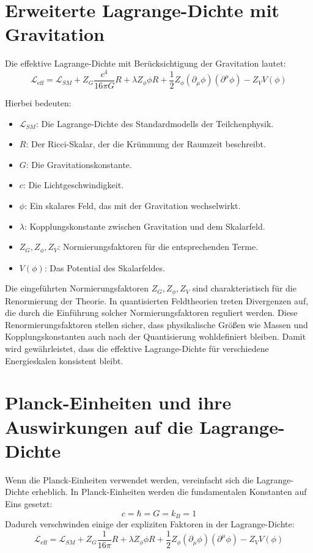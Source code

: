 \documentclass[a4paper,11pt]{article}
\begin{document}
	\section{Erweiterte Lagrange-Dichte mit Gravitation}
	Die effektive Lagrange-Dichte mit Berücksichtigung der Gravitation lautet:
	\begin{equation}
		\mathcal{L}_{\text{eff}} = \mathcal{L}_{SM} + Z_G \frac{c^4}{16\pi G} R + \lambda Z_\phi \phi R + \frac{1}{2} Z_\phi (\partial_\mu \phi)(\partial^\mu \phi) - Z_V V(\phi)
	\end{equation}
	
	Hierbei bedeuten:
	\begin{itemize}
		\item $\mathcal{L}_{SM}$: Die Lagrange-Dichte des Standardmodells der Teilchenphysik.
		\item $R$: Der Ricci-Skalar, der die Krümmung der Raumzeit beschreibt.
		\item $G$: Die Gravitationskonstante.
		\item $c$: Die Lichtgeschwindigkeit.
		\item $\phi$: Ein skalares Feld, das mit der Gravitation wechselwirkt.
		\item $\lambda$: Kopplungskonstante zwischen Gravitation und dem Skalarfeld.
		\item $Z_G, Z_\phi, Z_V$: Normierungsfaktoren für die entsprechenden Terme.
		\item $V(\phi)$: Das Potential des Skalarfeldes.
	\end{itemize}
	
	Die eingeführten Normierungsfaktoren $Z_G, Z_\phi, Z_V$ sind charakteristisch für die Renormierung der Theorie. In quantisierten Feldtheorien treten Divergenzen auf, die durch die Einführung solcher Normierungsfaktoren reguliert werden. Diese Renormierungsfaktoren stellen sicher, dass physikalische Größen wie Massen und Kopplungskonstanten auch nach der Quantisierung wohldefiniert bleiben. Damit wird gewährleistet, dass die effektive Lagrange-Dichte für verschiedene Energieskalen konsistent bleibt.
	
	\section{Planck-Einheiten und ihre Auswirkungen auf die Lagrange-Dichte}
	Wenn die Planck-Einheiten verwendet werden, vereinfacht sich die Lagrange-Dichte erheblich. In Planck-Einheiten werden die fundamentalen Konstanten auf Eins gesetzt:
	\begin{equation}
		c = \hbar = G = k_B = 1
	\end{equation}
	Dadurch verschwinden einige der expliziten Faktoren in der Lagrange-Dichte:
	\begin{equation}
		\mathcal{L}_{\text{eff}} = \mathcal{L}_{SM} + Z_G \frac{1}{16\pi} R + \lambda Z_\phi \phi R + \frac{1}{2} Z_\phi (\partial_\mu \phi)(\partial^\mu \phi) - Z_V V(\phi)
	\end{equation}
	
\end{document}
